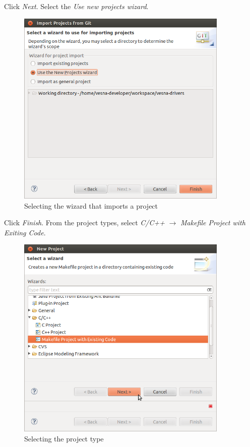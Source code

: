 \documentclass[a4paper, 10pt]{article}
\begin{document}
Click \emph{Next}.
Select the \emph{Use new projects wizard}.

    \begin{figure}[H]
    \centering
        \includegraphics[width=0.9\textwidth]{./install-guide-linux-images/test-select-wizard.png}
        \caption{Selecting the wizard that imports a project}
        \label{fig:test-select-wizard}
    \end{figure}

Click \emph{Finish}.
From the project types, select \emph{C/C++} $\rightarrow$
\emph{Makefile Project with Exiting Code}.

    \begin{figure}[H]
    \centering
        \includegraphics[width=0.9\textwidth]{./install-guide-linux-images/test-select-project-type.png}
        \caption{Selecting the project type}
        \label{fig:test-select-project-type}
    \end{figure}
\end{document}

